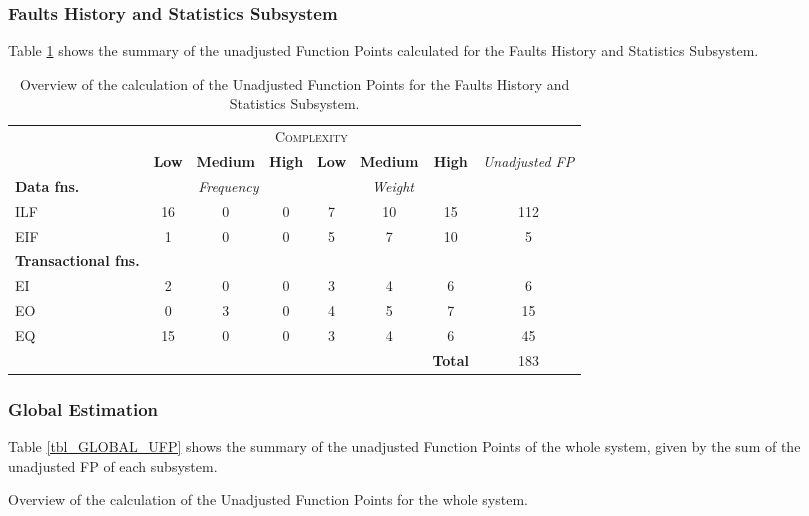 \subsubsection{Faults History and Statistics Subsystem}
Table \ref{tbl_FHSS_UFP} shows the summary of the unadjusted Function Points calculated for the Faults History and Statistics Subsystem.
\begin{table}[hbtp]
\centering
\begin{tabular}{|l|c|c|c|c|c|c|c|}
\cline{2-7}
\multicolumn{1}{c}{} & \multicolumn{6}{|c|}{\textsc{Complexity}} & \multicolumn{1}{c}{}  \\ \cline{2-8}
\multicolumn{1}{c|}{} & \textbf{Low} & \textbf{Medium} & \textbf{High} & \textbf{Low} & \textbf{Medium} & \textbf{High} & \multirow{2}{*}{\textit{Unadjusted FP}} \\ \cline{1-7}
\textbf{Data fns.} & \multicolumn{3}{|c|}{\textit{Frequency}} &  \multicolumn{3}{|c|}{\textit{Weight}} & \\ \hline
ILF 	& 16 & 0 & 0 & 7 & 10 & 15 & 112 	\\ \hline
EIF 	& 1  & 0 & 0 & 5 & 7  & 10 & 5		\\ \hline
\textbf{Transactional fns.} & \multicolumn{7}{|c|}{} \\ \hline
EI 		& 2  & 0 & 0 & 3 & 4  & 6  & 6 		\\ \hline
EO 		& 0  & 3 & 0 & 4 & 5  & 7  & 15		\\ \hline
EQ		& 15 & 0 & 0 & 3 & 4  & 6  & 45		\\ \hline
\multicolumn{6}{c|}{} & \textbf{Total} & 183 \\ \cline{7-8}
\end{tabular}
\caption{Overview of the calculation of the Unadjusted Function Points for the Faults History and Statistics Subsystem.}
\label{tbl_FHSS_UFP}
\end{table}

\subsubsection{Global Estimation}
Table \ref{tbl_GLOBAL_UFP} shows the summary of the unadjusted Function Points of the whole system, given by the sum of the unadjusted FP of each subsystem.
\begin{table}[hbtp]
\centering

\caption{Overview of the calculation of the Unadjusted Function Points for the whole system.}
\label{tbl_GLOBAL_UFP}
\end{table}

